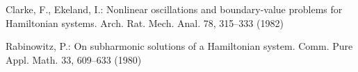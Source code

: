 \documentclass{llncs}
\begin{document}
%
%

\begin{thebibliography}{5}
%
Clarke, F., Ekeland, I.:
Nonlinear oscillations and
boundary-value problems for Hamiltonian systems.
Arch. Rat. Mech. Anal. 78, 315--333 (1982)

Rabinowitz, P.:
On subharmonic solutions of a Hamiltonian system.
Comm. Pure Appl. Math. 33, 609--633 (1980)

\end{thebibliography}

\clearpage
%
\end{document}
